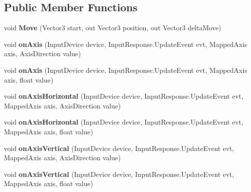 \subsection*{Public Member Functions}
\begin{DoxyCompactItemize}
\item 
\hypertarget{class_player_input_controller_aa617897cf92c385b734176b3c0f6a51b}{void {\bfseries Move} (Vector3 start, out Vector3 position, out Vector3 delta\-Move)}\label{class_player_input_controller_aa617897cf92c385b734176b3c0f6a51b}

\item 
\hypertarget{class_player_input_controller_a113e3417863a2d9ab228c795702607b3}{void {\bfseries on\-Axis} (Input\-Device device, Input\-Response.\-Update\-Event evt, Mapped\-Axis axis, Axis\-Direction value)}\label{class_player_input_controller_a113e3417863a2d9ab228c795702607b3}

\item 
\hypertarget{class_player_input_controller_a03be05ea0b3b1085b5633f59a9e131f5}{void {\bfseries on\-Axis} (Input\-Device device, Input\-Response.\-Update\-Event evt, Mapped\-Axis axis, float value)}\label{class_player_input_controller_a03be05ea0b3b1085b5633f59a9e131f5}

\item 
\hypertarget{class_player_input_controller_a9506d4adb70b38fb37a1f8171a53fa2e}{void {\bfseries on\-Axis\-Horizontal} (Input\-Device device, Input\-Response.\-Update\-Event evt, Mapped\-Axis axis, Axis\-Direction value)}\label{class_player_input_controller_a9506d4adb70b38fb37a1f8171a53fa2e}

\item 
\hypertarget{class_player_input_controller_a50f59443aa6b47628893eff83107c93e}{void {\bfseries on\-Axis\-Horizontal} (Input\-Device device, Input\-Response.\-Update\-Event evt, Mapped\-Axis axis, float value)}\label{class_player_input_controller_a50f59443aa6b47628893eff83107c93e}

\item 
\hypertarget{class_player_input_controller_abadac75139e4879a3de5d4e1947faa0e}{void {\bfseries on\-Axis\-Vertical} (Input\-Device device, Input\-Response.\-Update\-Event evt, Mapped\-Axis axis, Axis\-Direction value)}\label{class_player_input_controller_abadac75139e4879a3de5d4e1947faa0e}

\item 
\hypertarget{class_player_input_controller_ad97dbabee4ab8fccc583d38d2cd15447}{void {\bfseries on\-Axis\-Vertical} (Input\-Device device, Input\-Response.\-Update\-Event evt, Mapped\-Axis axis, float value)}\label{class_player_input_controller_ad97dbabee4ab8fccc583d38d2cd15447}

\end{DoxyCompactItemize}
